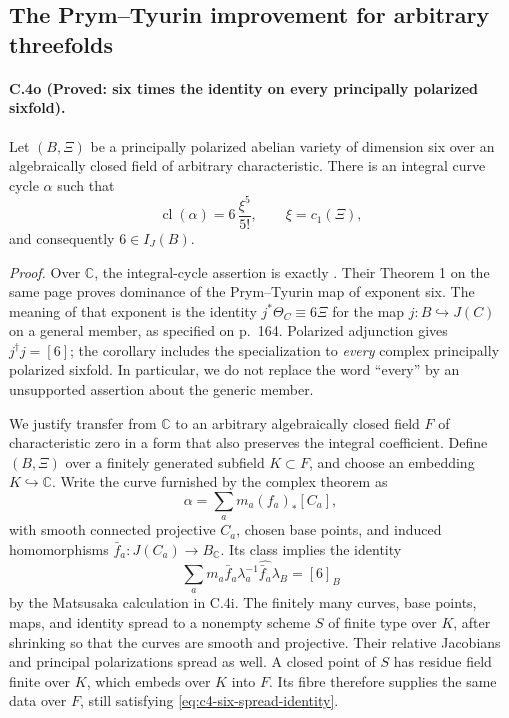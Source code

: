 \subsection{The Prym--Tyurin improvement for arbitrary threefolds}
\label{sec:c4-pt-six}

\paragraph{C.4o (Proved: six times the identity on every principally polarized sixfold).}
Let $(B,\Xi)$ be a principally polarized abelian variety of dimension
six over an algebraically closed field of arbitrary characteristic.
There is an integral curve cycle $\alpha$ such that
\begin{equation}\label{eq:c4-six-minimal}
       \operatorname{cl}(\alpha)=6\,\frac{\xi^5}{5!},
       \qquad \xi=c_1(\Xi),
\end{equation}
and consequently $6\in I_J(B)$.

\emph{Proof.}
Over $\mathbb C$, the integral-cycle assertion is exactly
\citet[Corollary 2, p.~165]{frC4ADFIO2020}.
Their Theorem 1 on the same page proves dominance of the
Prym--Tyurin map of exponent six. The meaning of that exponent is
the identity $j^*\Theta_C\equiv6\Xi$ for the map
$j:B\hookrightarrow J(C)$ on a general member, as specified on
p.~164. Polarized adjunction gives $j^\dagger j=[6]$;
the corollary includes the specialization to \emph{every} complex
principally polarized sixfold. In particular, we do not replace the
word ``every'' by an unsupported assertion about the generic member.

We justify transfer from $\mathbb C$ to an arbitrary algebraically
closed field $F$ of characteristic zero in a form that also preserves
the integral coefficient. Define $(B,\Xi)$ over a finitely generated
subfield $K\subset F$, and choose an embedding $K\hookrightarrow
\mathbb C$. Write the curve furnished by the complex theorem as
\[
             \alpha=\sum_a m_a(f_a)_*[C_a],
\]
with smooth connected projective $C_a$, chosen base points, and
induced homomorphisms $\bar f_a:J(C_a)\to B_{\mathbb C}$.
Its class implies the identity
\begin{equation}\label{eq:c4-six-spread-identity}
 \sum_a m_a\bar f_a\lambda_a^{-1}
                  \widehat{\bar f_a}\lambda_B=[6]_B
\end{equation}
by the Matsusaka calculation in C.4i. The finitely many curves,
base points, maps, and identity spread to a nonempty scheme $S$ of
finite type over $K$, after shrinking so that the curves are smooth
and projective. Their relative Jacobians and principal polarizations
spread as well. A closed point of $S$ has residue field finite over
$K$, which embeds over $K$ into $F$. Its fibre therefore supplies
the same data over $F$, still satisfying
\eqref{eq:c4-six-spread-identity}.

